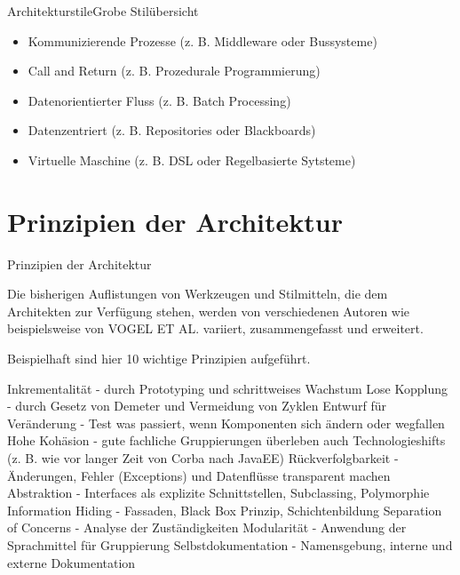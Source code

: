 \documentclass{beamer}
\begin{document}
\begin{frame}{Architekturstile}{Grobe Stilübersicht}
	\begin{itemize}
		\item Kommunizierende Prozesse (z. B. Middleware oder Bussysteme)
		\item Call and Return (z. B. Prozedurale Programmierung)
		\item Datenorientierter Fluss (z. B. Batch Processing)
		\item Datenzentriert (z. B. Repositories oder Blackboards)
		\item Virtuelle Maschine (z. B. DSL oder Regelbasierte Sytsteme)
	\end{itemize}




\end{frame}

\section{Prinzipien der Architektur}

\begin{frame}{Prinzipien der Architektur}

Die bisherigen Auflistungen von Werkzeugen und Stilmitteln, die dem Architekten zur Verfügung stehen, werden von verschiedenen Autoren wie beispielsweise von VOGEL ET AL. variiert, zusammengefasst und erweitert.

Beispielhaft sind hier 10 wichtige Prinzipien aufgeführt.

    Inkrementalität
    - durch Prototyping und schrittweises Wachstum
    Lose Kopplung
    - durch Gesetz von Demeter und Vermeidung von Zyklen
    Entwurf für Veränderung
    - Test was passiert, wenn Komponenten sich ändern oder wegfallen
    Hohe Kohäsion
    - gute fachliche Gruppierungen überleben auch Technologieshifts (z. B. wie vor langer Zeit von Corba nach JavaEE)
    Rückverfolgbarkeit
    - Änderungen, Fehler (Exceptions) und Datenflüsse transparent machen
    Abstraktion
    - Interfaces als explizite Schnittstellen, Subclassing, Polymorphie
    Information Hiding
    - Fassaden, Black Box Prinzip, Schichtenbildung
    Separation of Concerns
    - Analyse der Zuständigkeiten
    Modularität
    - Anwendung der Sprachmittel für Gruppierung
    Selbstdokumentation
    - Namensgebung, interne und externe Dokumentation
\end{frame}
\end{document}
